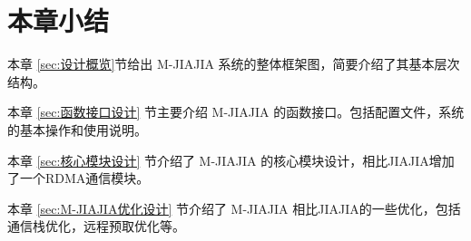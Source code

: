 {    \section{本章小结}
    本章 \ref{sec:设计概览}节给出 M-JIAJIA 系统的整体框架图，简要介绍了其基本层次结构。

    本章 \ref{sec:函数接口设计} 节主要介绍 M-JIAJIA 的函数接口。包括配置文件，系统的基本操作和使用说明。

    本章 \ref{sec:核心模块设计} 节介绍了 M-JIAJIA 的核心模块设计，相比JIAJIA增加了一个RDMA通信模块。

    本章 \ref{sec:M-JIAJIA优化设计} 节介绍了 M-JIAJIA 相比JIAJIA的一些优化，包括通信栈优化，远程预取优化等。
}

